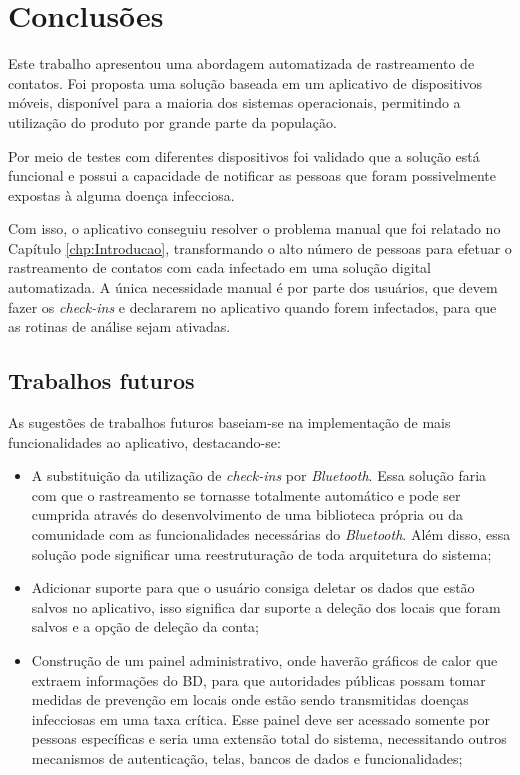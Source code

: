\chapter{Conclusões}\label{chp:conclusoes}

Este trabalho apresentou uma abordagem automatizada de rastreamento de contatos. Foi proposta uma solução baseada em um aplicativo de dispositivos móveis, disponível para a maioria dos sistemas operacionais, permitindo a utilização do produto por grande parte da população.

Por meio de testes com diferentes dispositivos foi validado que a solução está funcional e possui a capacidade de notificar as pessoas que foram possivelmente expostas à alguma doença infecciosa.

Com isso, o aplicativo conseguiu resolver o problema manual que foi relatado no Capítulo \ref{chp:Introducao}, transformando o alto número de pessoas para efetuar o rastreamento de contatos com cada infectado em uma solução digital automatizada. A única necessidade manual é por parte dos usuários, que devem fazer os \textit{check-ins} e declararem no aplicativo quando forem infectados, para que as rotinas de análise sejam ativadas.

\section{Trabalhos futuros}
As sugestões de trabalhos futuros baseiam-se na implementação de mais funcionalidades ao aplicativo, destacando-se:
\begin{itemize}
    \item A substituição da utilização de \textit{check-ins} por \textit{Bluetooth}. Essa solução faria com que o rastreamento se tornasse totalmente automático e pode ser cumprida através do desenvolvimento de uma biblioteca própria ou da comunidade com as funcionalidades necessárias do \textit{Bluetooth}. Além disso, essa solução pode significar uma reestruturação de toda arquitetura do sistema;
    \item Adicionar suporte para que o usuário consiga deletar os dados que estão salvos no aplicativo, isso significa dar suporte a deleção dos locais que foram salvos e a opção de deleção da conta;
    \item Construção de um painel administrativo, onde haverão gráficos de calor que extraem informações do BD, para que autoridades públicas possam tomar medidas de prevenção em locais onde estão sendo transmitidas doenças infecciosas em uma taxa crítica. Esse painel deve ser acessado somente por pessoas específicas e seria uma extensão total do sistema, necessitando outros mecanismos de autenticação, telas, bancos de dados e funcionalidades;
\end{itemize}
